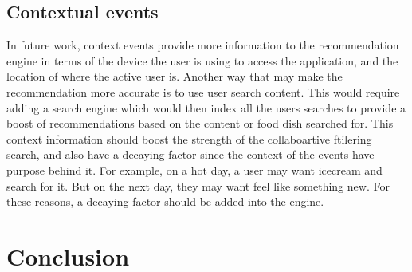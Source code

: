 \subsection{Contextual events}
In future work, context events provide more information to the recommendation engine in terms of the device the user is using to access the application, and the location of where the active user is. Another way that may make the recommendation more accurate is to use user search content. This would require adding a search engine which would then index all the users searches to provide a boost of recommendations based on the content or food dish searched for. This context information should boost the strength of the collaboartive ftilering search, and also have a decaying factor since the context of the events have purpose behind it. For example, on a hot day, a user may want icecream and search for it. But on the next day, they may want feel like something new. For these reasons, a decaying factor should be added into the engine.

\section{Conclusion}